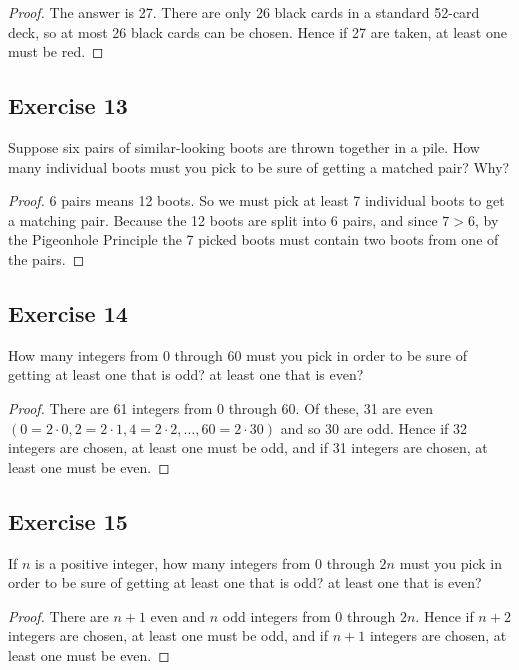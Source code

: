 \documentclass[14pt]{extarticle}
\begin{document}
\begin{proof}
The answer is 27. There are only 26 black cards in a standard 52-card deck, so at most 26 black cards can be chosen. Hence 
if 27 are taken, at least one must be red.
\end{proof}

\subsection{Exercise 13}
Suppose six pairs of similar-looking boots are thrown together in a pile. How many individual boots must you pick to be sure 
of getting a matched pair? Why?

\begin{proof}
6 pairs means 12 boots. So we must pick at least 7 individual boots to get a matching pair. Because the 12 boots are split 
into 6 pairs, and since \(7>6\), by the Pigeonhole Principle the 7 picked boots must contain two boots from one of the 
pairs.
\end{proof}

\subsection{Exercise 14}
How many integers from 0 through 60 must you pick in order to be sure of getting at least one that is odd? at least one that 
is even?

\begin{proof}
There are 61 integers from 0 through 60. Of these, 31 are even \((0 = 2 \cdot 0, 2 = 2 \cdot 1, 4 = 2 \cdot 2, 
\ldots, 60 = 2 \cdot 30)\) and so 30 are odd. Hence if 32 integers are chosen, at least one must be odd, and if 31 
integers are chosen, at least one must be even.
\end{proof}

\subsection{Exercise 15}
If \(n\) is a positive integer, how many integers from 0
through \(2n\) must you pick in order to be sure of getting 
at least one that is odd? at least one that is even?

\begin{proof}
There are \(n+1\) even and \(n\) odd integers from 0 through \(2n\). Hence if \(n+2\) integers are chosen, at least one 
must be odd, and if \(n+1\) integers are chosen, at least one must be even.
\end{proof}
\end{document}
